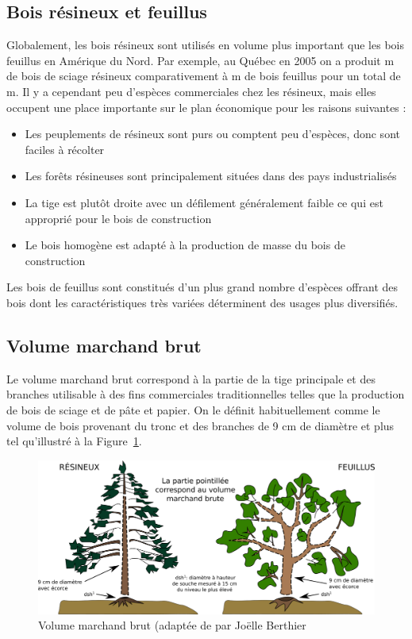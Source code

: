 \subsection{Bois résineux et feuillus}
 
Globalement, les bois résineux sont utilisés en volume plus important que les bois feuillus en Amérique du Nord. Par exemple, au Québec en 2005 on a produit  m de bois de sciage résineux comparativement à   m de bois feuillus pour un total de  m. Il y a cependant peu d'espèces commerciales chez les résineux, mais elles occupent une place importante sur le plan économique pour les raisons suivantes : 

\begin{itemize}
\item Les peuplements de résineux sont purs ou comptent peu d'espèces, donc sont faciles à récolter 
\item Les forêts résineuses sont principalement situées dans des pays industrialisés
\item La tige est plutôt droite avec un défilement généralement faible ce qui est approprié pour le bois de construction 
\item Le bois homogène est adapté à la production de masse du bois de construction 
\end{itemize}
 
Les bois de feuillus sont constitués d'un plus grand nombre d'espèces offrant des bois dont les caractéristiques très variées déterminent des usages plus diversifiés. 

\subsection{Volume marchand brut}
 
Le volume marchand brut correspond à la partie de la tige principale et des branches utilisable à des fins commerciales traditionnelles telles que la production de bois de sciage et de pâte et papier. On le définit habituellement comme le volume de bois provenant du tronc et des branches de 9 cm de diamètre et plus tel qu'illustré à la Figure~\ref{volume_march}. 

\begin{figure}[ht]
\centering
\includegraphics[scale=0.7]{img/ch2_volume_marchand}
\caption{Volume marchand brut (adaptée de \cite{quebec2003tarif} par Joëlle Berthier}
\label{volume_march}
\end{figure}

